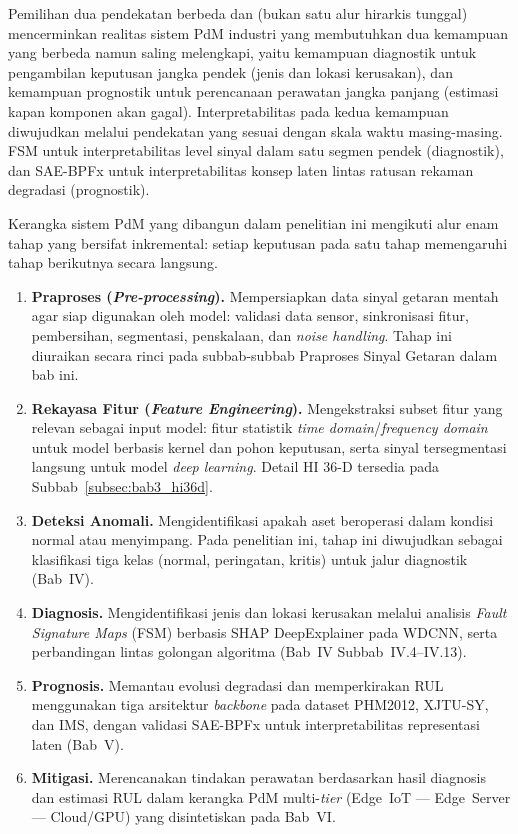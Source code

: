 Pemilihan {\color{blue}dua pendekatan berbeda} dan (bukan satu {\color{blue}alur} hirarkis tunggal) mencerminkan
realitas sistem PdM industri yang membutuhkan dua kemampuan yang berbeda
namun saling melengkapi, yaitu kemampuan diagnostik untuk pengambilan keputusan
jangka pendek (jenis dan lokasi kerusakan), dan kemampuan prognostik untuk
perencanaan perawatan jangka panjang (estimasi kapan komponen akan gagal).
Interpretabilitas pada kedua kemampuan diwujudkan melalui pendekatan yang
sesuai dengan skala waktu masing-masing. FSM untuk interpretabilitas level
sinyal dalam satu segmen pendek ({\color{blue}diagnostik}), dan SAE-BPFx untuk
interpretabilitas konsep laten lintas ratusan rekaman degradasi ({\color{blue}prognostik}).

{\color{blue}Kerangka sistem PdM yang dibangun dalam penelitian ini mengikuti alur
enam tahap yang bersifat inkremental: setiap keputusan pada satu tahap
memengaruhi tahap berikutnya secara langsung.}

{\color{blue}
\begin{enumerate}
  \item \textbf{Praproses (\emph{Pre-processing}).} Mempersiapkan data sinyal
        getaran mentah agar siap digunakan oleh model: validasi data sensor,
        sinkronisasi fitur, pembersihan, segmentasi, penskalaan, dan
        \emph{noise handling}. Tahap ini diuraikan secara rinci pada
        subbab-subbab Praproses Sinyal Getaran dalam bab ini.
  \item \textbf{Rekayasa Fitur (\emph{Feature Engineering}).} Mengekstraksi
        subset fitur yang relevan sebagai input model: fitur statistik
        \emph{time domain}/\emph{frequency domain} untuk model berbasis
        kernel dan pohon keputusan, serta sinyal tersegmentasi langsung untuk
        model \emph{deep learning}. Detail HI 36-D tersedia pada
        Subbab~\ref{subsec:bab3_hi36d}.
  \item \textbf{Deteksi Anomali.} Mengidentifikasi apakah aset beroperasi
        dalam kondisi normal atau menyimpang. Pada penelitian ini, tahap ini
        diwujudkan sebagai klasifikasi tiga kelas (normal, peringatan, kritis)
        untuk jalur diagnostik (Bab~IV).
  \item \textbf{Diagnosis.} Mengidentifikasi jenis dan lokasi kerusakan melalui
        analisis \emph{Fault Signature Maps} (FSM) berbasis SHAP DeepExplainer
        pada WDCNN, serta perbandingan lintas golongan algoritma
        (Bab~IV Subbab~IV.4--IV.13).
  \item \textbf{Prognosis.} Memantau evolusi degradasi dan memperkirakan RUL
        menggunakan tiga arsitektur \emph{backbone} pada dataset PHM2012,
        XJTU-SY, dan IMS, dengan validasi SAE-BPFx untuk interpretabilitas
        representasi laten (Bab~V).
  \item \textbf{Mitigasi.} Merencanakan tindakan perawatan berdasarkan hasil
        diagnosis dan estimasi RUL dalam kerangka PdM multi-\emph{tier}
        (Edge~IoT --- Edge~Server --- Cloud/GPU) yang disintetiskan pada
        Bab~VI.
\end{enumerate}
}

